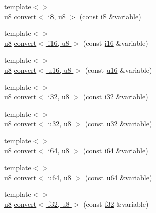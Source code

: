 \begin{DoxyCompactItemize}
\item 
{\footnotesize template$<$$>$ }\\\hyperlink{types_8h_a92c50087ca0e64fa93fc59402c55f8ca}{u8} \hyperlink{namespacecrap_a1b3f257a24b3405ed2e54289b78457fb}{convert$<$ i8, u8 $>$} (const \hyperlink{types_8h_ae3702327b5f47e83b431e22b33da7b58}{i8} \&variable)
\item 
{\footnotesize template$<$$>$ }\\\hyperlink{types_8h_a92c50087ca0e64fa93fc59402c55f8ca}{u8} \hyperlink{namespacecrap_a595381656f88c7e44678cd27da468c0d}{convert$<$ i16, u8 $>$} (const \hyperlink{types_8h_ad309dbcaeea13aa602d686964156ea0b}{i16} \&variable)
\item 
{\footnotesize template$<$$>$ }\\\hyperlink{types_8h_a92c50087ca0e64fa93fc59402c55f8ca}{u8} \hyperlink{namespacecrap_ac5c449c8e88115b380250cdea78eb374}{convert$<$ u16, u8 $>$} (const \hyperlink{types_8h_ace9d960e74685e2cd84b36132dbbf8aa}{u16} \&variable)
\item 
{\footnotesize template$<$$>$ }\\\hyperlink{types_8h_a92c50087ca0e64fa93fc59402c55f8ca}{u8} \hyperlink{namespacecrap_a52aa7b0f6fc7436de9c5b47bff21cf25}{convert$<$ i32, u8 $>$} (const \hyperlink{types_8h_a48d6cd8e4135fb2ff7e7f2dac84089ec}{i32} \&variable)
\item 
{\footnotesize template$<$$>$ }\\\hyperlink{types_8h_a92c50087ca0e64fa93fc59402c55f8ca}{u8} \hyperlink{namespacecrap_aae21321b6ed393d6193d83f1aa60bc0e}{convert$<$ u32, u8 $>$} (const \hyperlink{types_8h_afaa62991928fb9fb18ff0db62a040aba}{u32} \&variable)
\item 
{\footnotesize template$<$$>$ }\\\hyperlink{types_8h_a92c50087ca0e64fa93fc59402c55f8ca}{u8} \hyperlink{namespacecrap_acbf85ab8383f35ea83ad374e9116c997}{convert$<$ i64, u8 $>$} (const \hyperlink{types_8h_a85cb35fbe5bf2961d7ad5f26814a91a2}{i64} \&variable)
\item 
{\footnotesize template$<$$>$ }\\\hyperlink{types_8h_a92c50087ca0e64fa93fc59402c55f8ca}{u8} \hyperlink{namespacecrap_af9b21137732fb875d492c425acdd96df}{convert$<$ u64, u8 $>$} (const \hyperlink{types_8h_a3f7e2bcbb0b4c338f3c4f6c937cd4234}{u64} \&variable)
\item 
{\footnotesize template$<$$>$ }\\\hyperlink{types_8h_a92c50087ca0e64fa93fc59402c55f8ca}{u8} \hyperlink{namespacecrap_ae0f3ab9473979aa75faa49fb63935918}{convert$<$ f32, u8 $>$} (const \hyperlink{types_8h_a154db6eda6a99565cb060a1da4b4c930}{f32} \&variable)

\end{DoxyCompactItemize}
